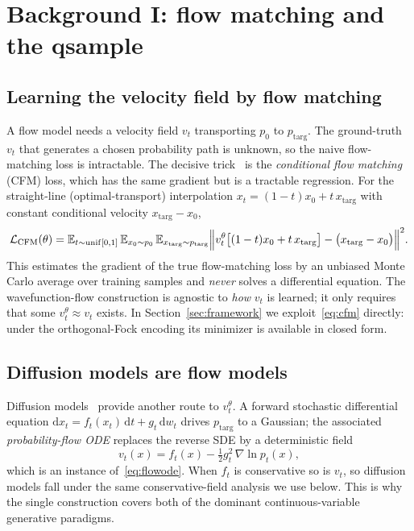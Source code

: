 \documentclass[11pt, a4paper]{article}
\newcommand{\Eblr}{\mathbb{E}}
\begin{document}
\section{Background I: flow matching and the qsample}
\label{sec:flowprimer}

\subsection{Learning the velocity field by flow matching}

A flow model needs a velocity field $v_t$ transporting $p_0$ to
$p_{\mathrm{targ}}$. The ground-truth $v_t$ that generates a chosen probability
path is unknown, so the naive flow-matching loss is intractable. The decisive
trick~\cite{Layden2025} is the \emph{conditional flow matching} (CFM) loss,
which has the same gradient but is a tractable regression. For the
straight-line (optimal-transport) interpolation
$x_t=(1-t)x_0+t\,x_{\mathrm{targ}}$ with constant conditional velocity
$x_{\mathrm{targ}}-x_0$,
\begin{equation}
  \mathcal{L}_{\mathrm{CFM}}(\theta)=
  \Eblr_{t\sim\mathrm{unif}[0,1]}\,
  \Eblr_{x_0\sim p_0}\,
  \Eblr_{x_{\mathrm{targ}}\sim p_{\mathrm{targ}}}
  \Bigl\|v_t^\theta\bigl[(1-t)x_0+t\,x_{\mathrm{targ}}\bigr]
  -\bigl(x_{\mathrm{targ}}-x_0\bigr)\Bigr\|^2 .
  \label{eq:cfm}
\end{equation}
This estimates the gradient of the true flow-matching loss by an unbiased Monte
Carlo average over training samples and \emph{never} solves a differential
equation. The wavefunction-flow construction is agnostic to \emph{how} $v_t$ is
learned; it only requires that some $v_t^\theta\approx v_t$ exists. In
Section~\ref{sec:framework} we exploit~\eqref{eq:cfm} directly: under the
orthogonal-Fock encoding its minimizer is available in closed form.

\subsection{Diffusion models are flow models}

Diffusion models~\cite{Layden2025} provide another route to $v_t^\theta$. A
forward stochastic differential equation $\mathrm{d}x_t=f_t(x_t)\,\mathrm{d}t+
g_t\,\mathrm{d}w_t$ drives $p_{\mathrm{targ}}$ to a Gaussian; the associated
\emph{probability-flow ODE} replaces the reverse SDE by a deterministic field
\begin{equation}
  v_t(x)=f_t(x)-\tfrac12 g_t^2\,\nabla\ln p_t(x),
\end{equation}
which is an instance of~\eqref{eq:flowode}. When $f_t$ is conservative so is
$v_t$, so diffusion models fall under the same conservative-field analysis we
use below. This is why the single construction covers both of the dominant
continuous-variable generative paradigms.
\end{document}
